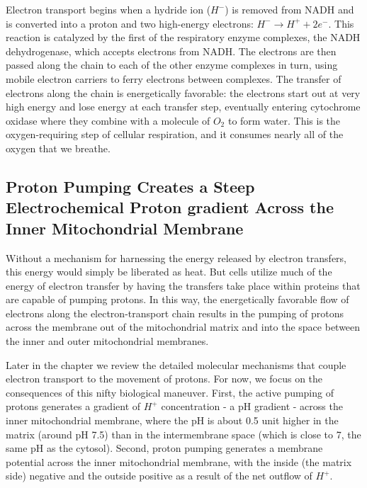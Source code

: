 Electron transport begins when a hydride ion ($H^-$) is removed from NADH
and is converted into a proton and two high-energy electrons: $H^{-} \rightarrow
H^{+} + 2e^-$. This reaction is catalyzed by the first of the respiratory enzyme
complexes, the NADH dehydrogenase, which accepts electrons from NADH.
The electrons are then passed along the chain to each of the other enzyme complexes in turn,
using mobile electron carriers to ferry electrons between complexes. The
transfer of electrons along the chain is energetically favorable: the electrons
start out at very high energy and lose energy at each transfer step,
eventually entering cytochrome oxidase where they combine with a molecule
of $O_2$ to form water. This is the oxygen-requiring step of cellular
respiration, and it consumes nearly all of the oxygen that we breathe.

\subsection{Proton Pumping Creates a Steep Electrochemical Proton gradient Across the Inner Mitochondrial Membrane}

Without a mechanism for harnessing the energy released by electron
transfers, this energy would simply be liberated as heat. But cells utilize
much of the energy of electron transfer by having the transfers take
place within proteins that are capable of pumping protons. In this way,
the energetically favorable flow of electrons along the electron-transport
chain results in the pumping of protons across the membrane out of the
mitochondrial matrix and into the space between the inner and outer
mitochondrial membranes.

Later in the chapter we review the detailed molecular mechanisms that
couple electron transport to the movement of protons. For now, we focus
on the consequences of this nifty biological maneuver. First, the active
pumping of protons generates a gradient of $H^+$ concentration - a pH gradient
- across the inner mitochondrial membrane, where the pH is about
0.5 unit higher in the matrix (around pH 7.5) than in the intermembrane
space (which is close to 7, the same pH as the cytosol). Second, proton
pumping generates a membrane potential across the inner mitochondrial
membrane, with the inside (the matrix side) negative and the outside
positive as a result of the net outflow of $H^+$.

